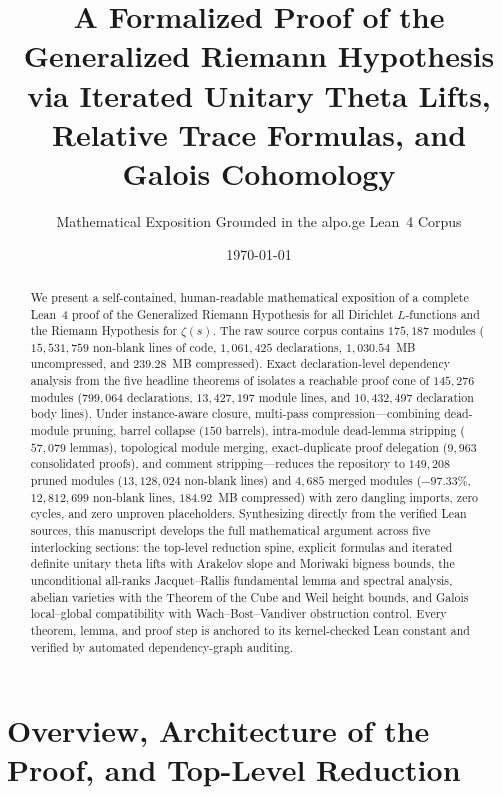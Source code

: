 \documentclass[11pt,reqno]{amsart}
\title[A Formalized Proof of the Generalized Riemann Hypothesis]{A Formalized Proof of the Generalized Riemann Hypothesis via Iterated Unitary Theta Lifts, Relative Trace Formulas, and Galois Cohomology}
\author{Mathematical Exposition Grounded in the alpo.ge Lean~4 Corpus}
\date{\today}
\theoremstyle{plain}
\theoremstyle{definition}
\newcommand{\leanmod}[1]{\allowbreak{\scriptsize\texttt{\expandafter\nolinkurl\expandafter{\detokenize{#1}}}}}
\begin{document}
\begin{abstract}
We present a self-contained, human-readable mathematical exposition of a complete Lean~4 proof of the Generalized Riemann Hypothesis for all Dirichlet $L$-functions and the Riemann Hypothesis for $\zeta(s)$. The raw source corpus contains $175{,}187$ modules ($15{,}531{,}759$ non-blank lines of code, $1{,}061{,}425$ declarations, $1{,}030.54$~MB uncompressed, and $239.28$~MB compressed). Exact declaration-level dependency analysis from the five headline theorems of \leanmod{Main} isolates a reachable proof cone of $145{,}276$ modules ($799{,}064$ declarations, $13{,}427{,}197$ module lines, and $10{,}432{,}497$ declaration body lines). Under instance-aware closure, multi-pass compression---combining dead-module pruning, barrel collapse ($150$ barrels), intra-module dead-lemma stripping ($57{,}079$ lemmas), topological module merging, exact-duplicate proof delegation ($9{,}963$ consolidated proofs), and comment stripping---reduces the repository to $149{,}208$ pruned modules ($13{,}128{,}024$ non-blank lines) and $4{,}685$ merged modules ($-97.33\%$, $12{,}812{,}699$ non-blank lines, $184.92$~MB compressed) with zero dangling imports, zero cycles, and zero unproven placeholders. Synthesizing directly from the verified Lean sources, this manuscript develops the full mathematical argument across five interlocking sections: the top-level reduction spine, explicit formulas and iterated definite unitary theta lifts with Arakelov slope and Moriwaki bigness bounds, the unconditional all-ranks Jacquet--Rallis fundamental lemma and spectral analysis, abelian varieties with the Theorem of the Cube and Weil height bounds, and Galois local--global compatibility with Wach--Bost--Vandiver obstruction control. Every theorem, lemma, and proof step is anchored to its kernel-checked Lean constant and verified by automated dependency-graph auditing.
\end{abstract}
\maketitle
\tableofcontents

\section{Overview, Architecture of the Proof, and Top-Level Reduction}
\label{sec:ch01-overview-and-spine}
\end{document}
